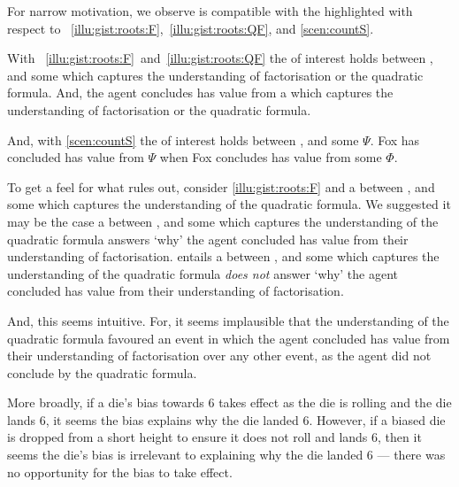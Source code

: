 \begin{note}
  For narrow motivation, we observe \issueInclusion{} is compatible with the  highlighted with respect to ~\ref{illu:gist:roots:F},~\ref{illu:gist:roots:QF}, and \ref{scen:countS}.

  With ~\ref{illu:gist:roots:F}~and~\ref{illu:gist:roots:QF} the \ros{} of interest holds between \propM{\rootsCon{}},  and some \pool{} which captures the \agents{} understanding of factorisation or the quadratic formula.
  And, the agent concludes \propM{\rootsCon{}} has value  from a \pool{} which captures the \agents{} understanding of factorisation or the quadratic formula.

  And, with \autoref{scen:countS} the \ros{} of interest holds between ,  and some \pool{} \(\Psi\).
  Fox has concluded  has value  from \(\Psi\) when Fox concludes \propI{\signConA{}} has value  from some \pool{} \(\Phi\).
\end{note}


\begin{note}
  To get a feel for what \issueInclusion{} rules out, consider \autoref{illu:gist:roots:F} and a \ros{} between \propM{\rootsCon{}},  and some \pool{} which captures the \agents{} understanding of the quadratic formula.
  We suggested it may be the case a \ros{} between \propM{\rootsCon{}},  and some \pool{} which captures the \agents{} understanding of the quadratic formula answers `why' the agent concluded \propM{\rootsCon{}} has value  from their understanding of factorisation.
  \issueInclusion{} entails a \ros{} between \propM{\rootsCon{}},  and some \pool{} which captures the \agents{} understanding of the quadratic formula \emph{does not} answer `why' the agent concluded \propM{\rootsCon{}} has value  from their understanding of factorisation.

  And, this seems intuitive.
  For, it seems implausible that the \agents{} understanding of the quadratic formula favoured an event in which the agent concluded \propM{\rootsCon{}} has value  from their understanding of factorisation over any other event, as the agent did not conclude by the quadratic formula.

  More broadly, if a die's bias towards \(6\) takes effect as the die is rolling and the die lands \(6\), it seems the bias explains why the die landed \(6\).
  However, if a biased die is dropped from a short height to ensure it does not roll and lands \(6\), then it seems the die's bias is irrelevant to explaining why the die landed \(6\) --- there was no opportunity for the bias to take effect.
\end{note}


